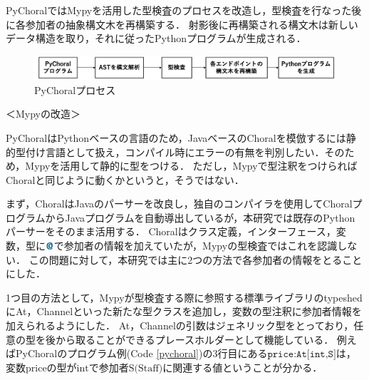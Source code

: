 \documentclass{thesis}
\newcommand{\mblue}[1]{\textbf{\textsf{\color{MidnightBlue}#1}}}
\begin{document}
PyChoralではMypyを活用した型検査のプロセスを改造し，型検査を行なった後に各参加者の抽象構文木を再構築する．
射影後に再構築される構文木は新しいデータ構造を取り，それに従ったPythonプログラムが生成される．

\begin{figure}[H]
  \centering
  \includegraphics[scale=0.4]{image/pychoralprocess.png}
  \caption{PyChoralプロセス}
  \label{pychoralprocess}
\end{figure}
＜Mypyの改造＞

PyChoralはPythonベースの言語のため，JavaベースのChoralを模倣するには静的型付け言語として扱え，コンパイル時にエラーの有無を判別したい．そのため，Mypyを活用して静的に型をつける．
ただし，Mypyで型注釈をつけらればChoralと同じように動くかというと，そうではない．

まず，ChoralはJavaのパーサーを改良し，独自のコンパイラを使用してChoralプログラムからJavaプログラムを自動導出しているが，本研究では既存のPythonパーサーをそのまま活用する．
Choralはクラス定義，インターフェース，変数，型に$\mblue{@}$で参加者の情報を加えていたが，Mypyの型検査ではこれを認識しない．
この問題に対して，本研究では主に2つの方法で各参加者の情報をとることにした．

1つ目の方法として，Mypyが型検査する際に参照する標準ライブラリのtypeshedに\textsf{At，Channel}といった新たな型クラスを追加し，変数の型注釈に参加者情報を加えられるようにした．
\textsf{At，Channel}の引数はジェネリック型をとっており，任意の型を後から取ることができるプレースホルダーとして機能している．
例えばPyChoralのプログラム例(Code \ref{pychoral})の3行目にある$\texttt{price:At[int,S]}$は，変数$\text{price}$の型が$\text{int}$で参加者$\text{S(Staff)}$に関連する値ということが分かる．
\end{document}
